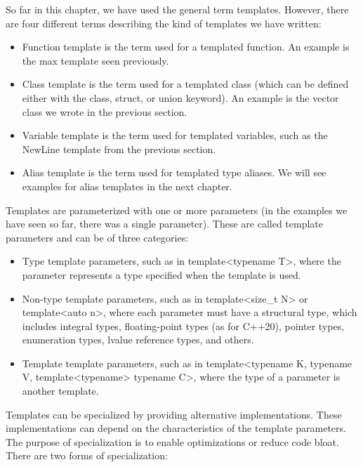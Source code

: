 So far in this chapter, we have used the general term templates. However, there are four different terms describing the kind of templates we have written:

\begin{itemize}
\item
Function template is the term used for a templated function. An example is the max template seen previously.

\item
Class template is the term used for a templated class (which can be defined either with the class, struct, or union keyword). An example is the vector class we wrote in the previous section.

\item
Variable template is the term used for templated variables, such as the NewLine template from the previous section.

\item
Alias template is the term used for templated type aliases. We will see examples for alias templates in the next chapter.
\end{itemize}

Templates are parameterized with one or more parameters (in the examples we have seen so far, there was a single parameter). These are called template parameters and can be of three categories:

\begin{itemize}
\item
Type template parameters, such as in template<typename T>, where the parameter represents a type specified when the template is used.

\item
Non-type template parameters, such as in template<size\_t N> or template<auto n>, where each parameter must have a structural type, which includes integral types, floating-point types (as for C++20), pointer types, enumeration types, lvalue reference types, and others.

\item
Template template parameters, such as in template<typename K, typename V, template<typename> typename C>, where the type of a parameter is another template.
\end{itemize}

Templates can be specialized by providing alternative implementations. These implementations can depend on the characteristics of the template parameters. The purpose of specialization is to enable optimizations or reduce code bloat. There are two forms of specialization:

